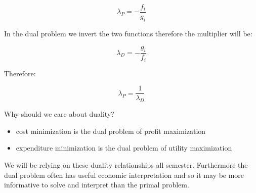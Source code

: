 \documentclass[11pt,english]{article}
\begin{document}
\begin{equation*}
\lambda _{P}=-\frac{f_{i}}{g_{i}}
\end{equation*}

In the dual problem we invert the two functions therefore the multiplier
will be:

\begin{equation*}
\lambda _{D}=-\frac{g_{i}}{f_{i}}
\end{equation*}

Therefore:

\begin{equation*}
\lambda _{P}=\frac{1}{\lambda _{D}}
\end{equation*}

Why should we care about duality?

\begin{itemize}
\item cost minimization is the dual problem of profit maximization

\item expenditure minimization is the dual problem of utility maximization
\end{itemize}

We will be relying on these duality relationships all semester. Furthermore
the dual problem often has useful economic interpretation and so it may be
more informative to solve and interpret than the primal problem.

\bigskip
\end{document}
